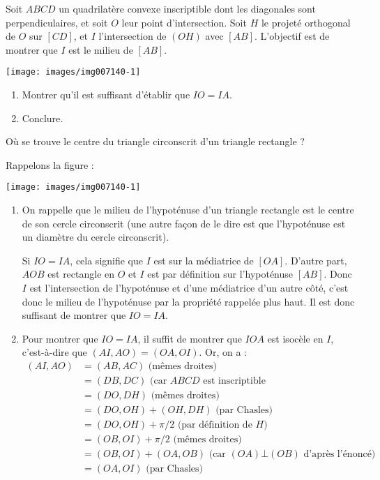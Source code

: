 \begin{exo}%
Soit $ABCD$ un quadrilatère convexe inscriptible dont les diagonales sont perpendiculaires, et soit $O$ leur point d'intersection. Soit $H$ le projeté orthogonal de $O$ sur $[CD]$, et $I$ l'intersection de $(OH)$ avec $[AB]$. L'objectif est de montrer que $I$ est le milieu de $[AB]$. 


\begin{center}
\texttt{[image: images/img007140-1]}
\end{center}

\begin{enumerate}
\item Montrer qu'il est suffisant d'établir que $IO=IA$.
\item Conclure.
\end{enumerate}


\begin{hint}
Où se trouve le centre du triangle circonscrit d'un triangle rectangle ?
\end{hint}
\begin{sol}

Rappelons la figure :

\begin{center}
\texttt{[image: images/img007140-1]}
\end{center}

\begin{enumerate}
\item On rappelle que le milieu de l'hypoténuse d'un triangle rectangle est le centre de son cercle circonscrit (une autre façon de le dire est que l'hypoténuse est un diamètre du cercle circonscrit).

Si $IO=IA$, cela signifie que $I$ est sur la médiatrice de $[OA]$. D'autre part, $AOB$ est rectangle en $O$ et $I$ est par définition sur l'hypoténuse $[AB]$. Donc $I$ est  l'intersection de l'hypoténuse et d'une médiatrice d'un autre côté, c'est donc le milieu de l'hypoténuse par la propriété rappelée plus haut. Il est donc suffisant de montrer que $IO=IA$.


\item Pour montrer que $IO=IA$, il suffit de montrer que $IOA$ est isocèle en $I$, c'est-à-dire que $(AI,AO)=(OA,OI)$. Or, on a :
\begin{align*}
(AI,AO)& = (AB,AC) \text{ (mêmes droites)}\\
&= (DB,DC) \text{ (car $ABCD$ est inscriptible}\\
&= (DO,DH) \text{ (mêmes droites)}\\
&= (DO,OH)+(OH,DH) \text{ (par Chasles)}\\
&= (DO,OH)+\pi/2 \text{ (par définition de $H$)}\\
&= (OB,OI)+\pi/2 \text{ (mêmes droites)}\\
&= (OB,OI) + (OA,OB) \text{ (car $(OA)\bot (OB)$ d'après l'énoncé)}\\
&= (OA,OI) \text{ (par Chasles)}
\end{align*}
\end{enumerate}

\end{sol}
\end{exo}

